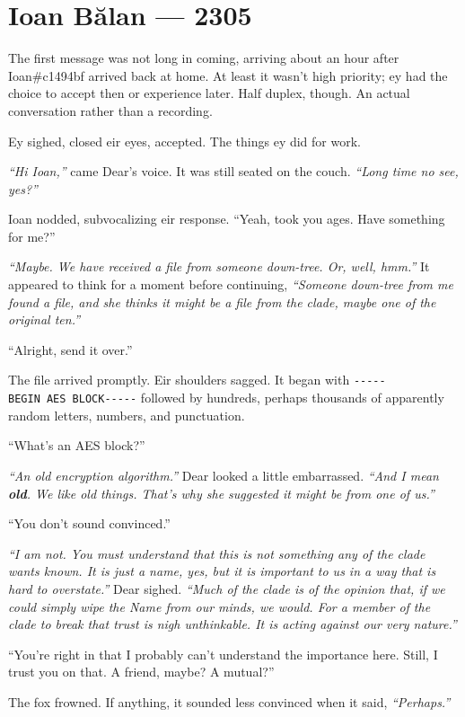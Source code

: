\hypertarget{ioan-bux103lan-2305}{%
\chapter*{Ioan Bălan — 2305}\label{ioan-bux103lan-2305}}

The first message was not long in coming, arriving about an hour after Ioan\#c1494bf arrived back at home. At least it wasn't high priority; ey had the choice to accept then or experience later. Half duplex, though. An actual conversation rather than a recording.

Ey sighed, closed eir eyes, accepted. The things ey did for work.

\emph{``Hi Ioan,''} came Dear's voice. It was still seated on the couch. \emph{``Long time no see, yes?''}

Ioan nodded, subvocalizing eir response. ``Yeah, took you ages. Have something for me?''

\emph{``Maybe. We have received a file from someone down-tree. Or, well, hmm.''} It appeared to think for a moment before continuing, \emph{``Someone down-tree from me found a file, and she thinks it might be a file from the clade, maybe one of the original ten.''}

``Alright, send it over.''

The file arrived promptly. Eir shoulders sagged. It began with \texttt{-\/-\/-\/-\/-BEGIN\ AES\ BLOCK-\/-\/-\/-\/-} followed by hundreds, perhaps thousands of apparently random letters, numbers, and punctuation.

``What's an AES block?''

\emph{``An old encryption algorithm.''} Dear looked a little embarrassed. \emph{``And I mean \textbf{old}. We like old things. That's why she suggested it might be from one of us.''}

``You don't sound convinced.''

\emph{``I am not. You must understand that this is not something any of the clade wants known. It is just a name, yes, but it is important to us in a way that is hard to overstate.''} Dear sighed. \emph{``Much of the clade is of the opinion that, if we could simply wipe the Name from our minds, we would. For a member of the clade to break that trust is nigh unthinkable. It is acting against our very nature.''}

``You're right in that I probably can't understand the importance here. Still, I trust you on that. A friend, maybe? A mutual?''

The fox frowned. If anything, it sounded less convinced when it said, \emph{``Perhaps.''}

